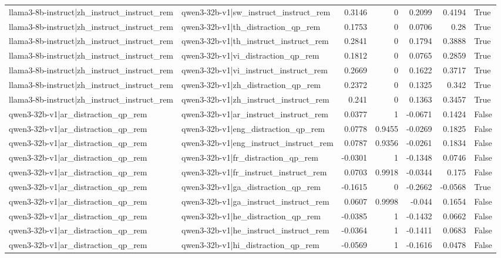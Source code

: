 \begin{table}
\begin{tabular}{l l r r r r l}
llama3-8b-instruct|zh_instruct_instruct_rem & qwen3-32b-v1|sw_instruct_instruct_rem & 0.3146 & 0 & 0.2099 & 0.4194 & True \\
llama3-8b-instruct|zh_instruct_instruct_rem & qwen3-32b-v1|th_distraction_qp_rem & 0.1753 & 0 & 0.0706 & 0.28 & True \\
llama3-8b-instruct|zh_instruct_instruct_rem & qwen3-32b-v1|th_instruct_instruct_rem & 0.2841 & 0 & 0.1794 & 0.3888 & True \\
llama3-8b-instruct|zh_instruct_instruct_rem & qwen3-32b-v1|vi_distraction_qp_rem & 0.1812 & 0 & 0.0765 & 0.2859 & True \\
llama3-8b-instruct|zh_instruct_instruct_rem & qwen3-32b-v1|vi_instruct_instruct_rem & 0.2669 & 0 & 0.1622 & 0.3717 & True \\
llama3-8b-instruct|zh_instruct_instruct_rem & qwen3-32b-v1|zh_distraction_qp_rem & 0.2372 & 0 & 0.1325 & 0.342 & True \\
llama3-8b-instruct|zh_instruct_instruct_rem & qwen3-32b-v1|zh_instruct_instruct_rem & 0.241 & 0 & 0.1363 & 0.3457 & True \\
qwen3-32b-v1|ar_distraction_qp_rem & qwen3-32b-v1|ar_instruct_instruct_rem & 0.0377 & 1 & -0.0671 & 0.1424 & False \\
qwen3-32b-v1|ar_distraction_qp_rem & qwen3-32b-v1|eng_distraction_qp_rem & 0.0778 & 0.9455 & -0.0269 & 0.1825 & False \\
qwen3-32b-v1|ar_distraction_qp_rem & qwen3-32b-v1|eng_instruct_instruct_rem & 0.0787 & 0.9356 & -0.0261 & 0.1834 & False \\
qwen3-32b-v1|ar_distraction_qp_rem & qwen3-32b-v1|fr_distraction_qp_rem & -0.0301 & 1 & -0.1348 & 0.0746 & False \\
qwen3-32b-v1|ar_distraction_qp_rem & qwen3-32b-v1|fr_instruct_instruct_rem & 0.0703 & 0.9918 & -0.0344 & 0.175 & False \\
qwen3-32b-v1|ar_distraction_qp_rem & qwen3-32b-v1|ga_distraction_qp_rem & -0.1615 & 0 & -0.2662 & -0.0568 & True \\
qwen3-32b-v1|ar_distraction_qp_rem & qwen3-32b-v1|ga_instruct_instruct_rem & 0.0607 & 0.9998 & -0.044 & 0.1654 & False \\
qwen3-32b-v1|ar_distraction_qp_rem & qwen3-32b-v1|he_distraction_qp_rem & -0.0385 & 1 & -0.1432 & 0.0662 & False \\
qwen3-32b-v1|ar_distraction_qp_rem & qwen3-32b-v1|he_instruct_instruct_rem & -0.0364 & 1 & -0.1411 & 0.0683 & False \\
qwen3-32b-v1|ar_distraction_qp_rem & qwen3-32b-v1|hi_distraction_qp_rem & -0.0569 & 1 & -0.1616 & 0.0478 & False \\

\end{tabular}
\end{table}
